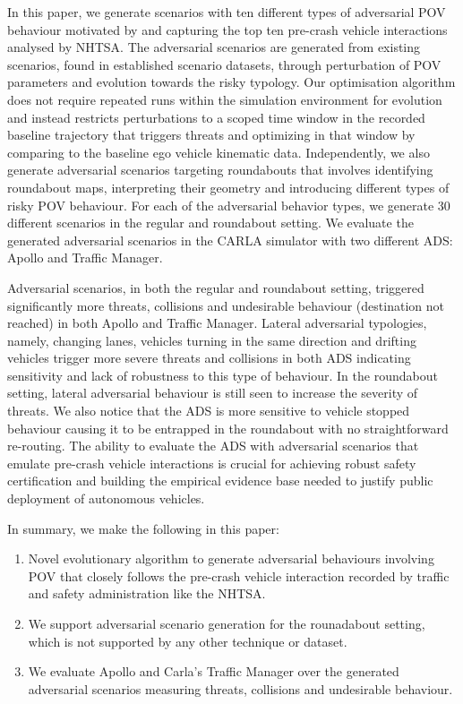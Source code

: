\documentclass[sigconf,review,anonymous]{acmart}
\begin{document}
In this paper, we generate scenarios with ten different types of adversarial POV behaviour motivated by and capturing the top ten pre-crash vehicle interactions analysed by NHTSA. The adversarial scenarios are generated from existing scenarios, found in established scenario datasets, through perturbation of POV parameters and evolution towards the risky typology. Our optimisation algorithm does not require repeated runs within the simulation environment for evolution and instead restricts perturbations to a scoped time window in the recorded baseline trajectory that triggers threats and optimizing in that window by comparing to the baseline ego vehicle kinematic data.  Independently, we also generate adversarial scenarios targeting roundabouts that involves identifying roundabout maps, interpreting their geometry and introducing different types of risky POV behaviour.   
For each of the adversarial behavior types, we generate 30 different scenarios in the regular and roundabout setting. We evaluate the generated adversarial scenarios in the CARLA simulator with two different ADS: Apollo and Traffic Manager. 

Adversarial scenarios, in both the regular and roundabout setting, triggered significantly more threats, collisions and undesirable behaviour (destination not reached) in both Apollo and Traffic Manager. Lateral adversarial typologies, namely, changing lanes, vehicles turning in the same direction and drifting vehicles trigger more severe threats and collisions in both ADS indicating sensitivity and lack of robustness to this type of behaviour. In the roundabout setting, lateral adversarial behaviour is still seen to increase the severity of threats. We also notice that the ADS is more sensitive to vehicle stopped behaviour causing it to be entrapped in the roundabout with no straightforward re-routing. 
The ability to evaluate the ADS with adversarial scenarios that emulate pre-crash vehicle interactions is crucial for achieving robust safety certification and building the empirical evidence base needed to justify public deployment of autonomous vehicles.

In summary, we make the following in this paper:
\begin{enumerate}
    \item Novel evolutionary algorithm to generate adversarial behaviours involving POV that closely follows the pre-crash vehicle interaction recorded by traffic and safety administration like the NHTSA. 
    \item We support adversarial scenario generation for the rounadabout setting, which is not supported by any other technique or dataset. 
    \item We evaluate Apollo and Carla's Traffic Manager over the generated adversarial scenarios measuring threats, collisions and undesirable behaviour. 
\end{enumerate}
\fi
\end{document}
